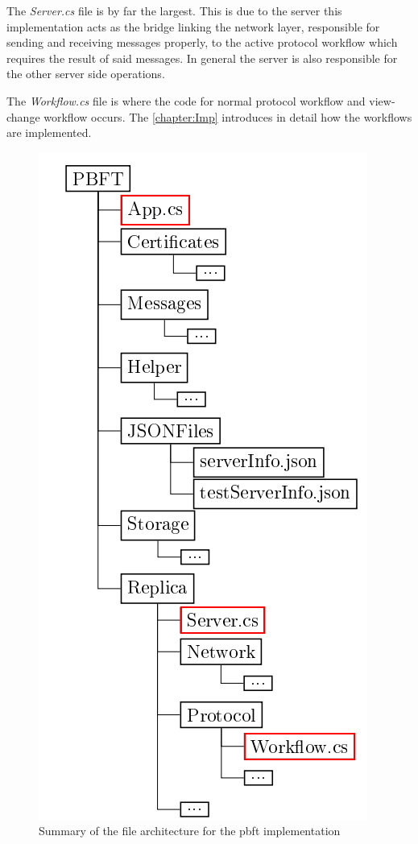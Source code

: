 The \emph{Server.cs} file is by far the largest. This is due to the server this implementation  acts as the bridge linking the network layer, responsible for sending and receiving messages properly, to the active protocol workflow which requires the result of said messages. In general the server is also responsible for the other server side operations.

The \emph{Workflow.cs} file is where the code for normal protocol workflow and view-change workflow occurs. The \autoref{chapter:Imp} introduces in detail how the workflows are implemented.
%

\begin{figure}[H]
	\includegraphics[width=0.45\linewidth]{figures/filestructtest}
	\caption{Summary of the file architecture for the \ac{pbft} implementation}
    \label{fig:filestruct}
\end{figure}

\newpage

